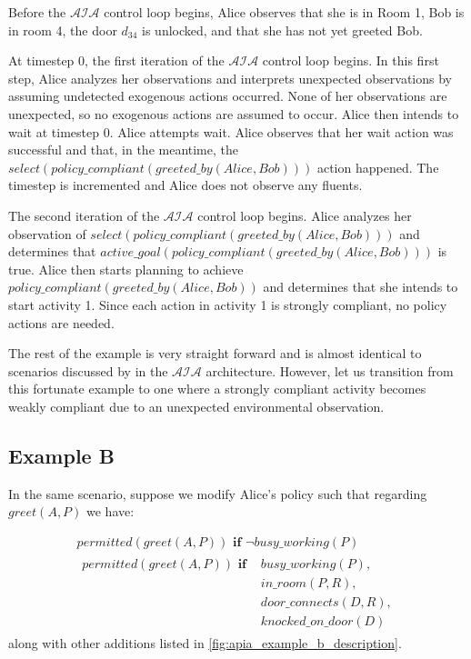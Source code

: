 Before the $\mathcal{AIA}$ control loop begins, Alice observes that she is in Room 1, Bob is in room 4, the door $d_{34}$ is unlocked, and that she has not yet greeted Bob.

At timestep 0, the first iteration of the $\mathcal{AIA}$ control loop begins.
In this first step, Alice analyzes her observations and interprets unexpected observations by assuming undetected exogenous actions occurred.
None of her observations are unexpected, so no exogenous actions are assumed to occur.
Alice then intends to wait at timestep 0.
Alice attempts wait.
Alice observes that her wait action was successful and that, in the meantime, the $select(policy\_compliant(greeted\_by(Alice, Bob)))$ action happened.
The timestep is incremented and Alice does not observe any fluents.

The second iteration of the $\mathcal{AIA}$ control loop begins.
Alice analyzes her observation of $select(policy\_compliant(greeted\_by(Alice, Bob)))$ and determines that $active\_goal(policy\_compliant(greeted\_by(Alice, Bob)))$ is true.
Alice then starts planning to achieve $policy\_compliant(greeted\_by(Alice, Bob))$ and determines that she intends to start activity 1.
Since each action in activity 1 is strongly compliant, no policy actions are needed.

The rest of the example is very straight forward and is almost identical to scenarios discussed by \citet{blount_architecture_2013,blount_towards_2014} in the $\mathcal{AIA}$ architecture.
However, let us transition from this fortunate example to one where a strongly compliant activity becomes weakly compliant due to an unexpected environmental observation.

\subsection{Example B}

In the same scenario, suppose we modify Alice's policy such that regarding $greet(A, P)$ we have:

\begin{gather}
    permitted(greet(A, P)) \textbf{ if }
        \neg busy\_working(P) \\
    \begin{split}
        permitted(greet(A, P)) \textbf{ if }
            & busy\_working(P), \\
            & in\_room(P, R), \\
            & door\_connects(D, R), \\
            & knocked\_on\_door(D)
    \end{split}
\end{gather}
along with other additions listed in \cref{fig:apia_example_b_description}.

